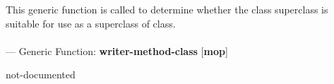 \begin{adjustwidth}{5em}{5em}
This generic function is called to determine whether the class
  superclass is suitable for use as a superclass of class.
\end{adjustwidth}

\paragraph{}
\label{MOP:WRITER-METHOD-CLASS}
--- Generic Function: \textbf{writer-method-class} [\textbf{mop}] \textit{}

\begin{adjustwidth}{5em}{5em}
not-documented
\end{adjustwidth}

